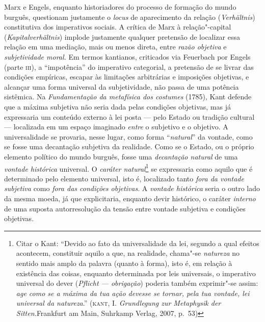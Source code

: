 Marx e Engels, enquanto historiadores do processo de formação do mundo
burguês, questionam justamente o \emph{locus} de aparecimento da relação
(\emph{Verhältnis}) constitutiva dos imperativos sociais. A crítica de
Marx à relação"-capital (\emph{Kapitalverhältnis}) implode justamente
qualquer pretensão de localizar essa relação em uma mediação, mais ou
menos direta, entre \emph{razão objetiva} e \emph{subjetividade moral.}
Em termos kantianos, criticados via Feuerbach por Engels (parte
\textsc{iii}), a ``impotência'' do imperativo categorial, a pretensão de
se livrar das condições empíricas, escapar às limitações arbitrárias e
imposições objetivas, e alcançar uma forma universal da subjetividade,
não passa de uma potência sistêmica. Na \emph{Fundamentação da
metafísica dos costumes} (1785), Kant defende que a máxima subjetiva não
seria dada pelas condições objetivas, mas já expressaria um conteúdo
externo à lei posta --- pelo Estado ou tradição cultural --- localizada
em um espaço imaginado \emph{entre} o subjetivo e o objetivo. A
universalidade se provaria, nesse lugar, como forma ``\emph{natural}''
da vontade, como se fosse uma decantação subjetiva da realidade. Como se
o Estado, ou o próprio elemento político do mundo burguês, fosse uma
\emph{decantação natural} de uma \emph{vontade histórica} universal. O
\emph{caráter natural}\footnote{Citar o Kant: ``Devido ao fato da %
  universalidade da lei, segundo a qual efeitos acontecem, constituir
  aquilo a que, na realidade, chama"-se \emph{natureza} no sentido mais
  amplo da palavra (quanto à forma), isto é, em relação à existência das
  coisas, enquanto determinada por leis universais, o imperativo
  universal do dever (\emph{Pflicht --- obrigação}) poderia também
  exprimir"-se assim: \emph{age como se a máxima da tua ação devesse se
  tornar, pela tua vontade, lei universal da natureza}.''
  (\textsc{kant}, I. \emph{Grundlegung zur Metaphysik der
  Sitten.}Frankfurt am Main, Suhrkamp Verlag, 2007, p.~53)} se
expressaria como aquilo que é determinado pelo elemento universal, isto
é, localizado tanto \emph{fora da vontade subjetiva} como \emph{fora das
condições objetivas}. A \emph{vontade histórica} seria o outro lado da
mesma moeda, já que explicitaria, enquanto devir histórico, o caráter
\emph{interno} de uma suposta autorresolução da tensão entre vontade
subjetiva e condições objetivas.

